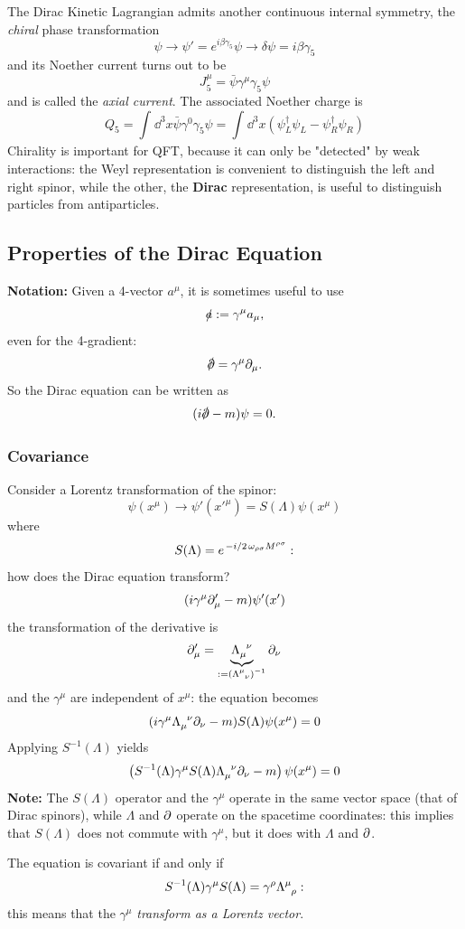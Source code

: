 
The Dirac Kinetic Lagrangian admits another continuous internal symmetry, the
\textit{chiral} phase transformation
$$\psi\rightarrow\psi' = e^{i\beta\gamma_5}\psi\rightarrow
\delta\psi=i\beta\gamma_5$$
and its Noether current turns out to be
$$J^\mu_5 = \bar\psi\gamma^\mu\gamma_5\psi$$
and is called the \textit{axial current}. The associated Noether charge is
$$Q_5 = \int_{}^{}\dd^3x\bar\psi\gamma^0\gamma_5\psi=
\int_{}^{}\dd^3x\left(\psi^\dagger_L\psi_L - \psi^\dagger_R\psi_R\right)$$
Chirality is important for QFT, because it can only be "detected" by weak
interactions: the Weyl representation is convenient to distinguish the left
and right spinor, while the other, the \textbf{Dirac} representation, is useful
to distinguish particles from antiparticles.
\subsection{Properties of the Dirac Equation}
\textbf{Notation:} Given a 4-vector $a^\mu$, it is sometimes useful to use
$$\slashed{a} := \gamma^\mu a_\mu,$$
even for the 4-gradient:
$$\slashed{\pd} = \gamma^\mu\pd_\mu.$$
So the Dirac equation can be written as
$$(i\slashed{\pd}-m)\psi=0.$$
\subsubsection{Covariance}
Consider a Lorentz transformation of the spinor:
$$\psi(x^\mu)\rightarrow\psi'(x'^\mu) = S(\Lambda)\psi(x^\mu)$$
where
$$S(\Lambda) = e^{\flatfrac{-i}{2}\omega_{\rho\sigma}M^{\rho\sigma}}:$$
how does the Dirac equation transform?
$$(i\gamma^\mu\partial_\mu'-m)\psi'(x')$$
the transformation of the derivative is
$$\pd_\mu' = \underbrace{\Lambda\indices{_\mu^\nu}}_{:=\left(
\Lambda\indices{^\mu_\nu}\right)^{-1}}\pd_\nu$$
and the $\gamma^\mu$ are independent of $x^\mu$: the equation becomes
$$(i\gamma^\mu\Lambda\indices{_\mu^\nu}\pd_\nu-m)S(\Lambda)\psi(x^\mu)=0$$
Applying $S^{-1}(\Lambda)$ yields
$$\left(S^{-1}(\Lambda)\gamma^\mu S(\Lambda)\Lambda\indices{_\mu^\nu}\pd_\nu
-m\right)\psi(x^\mu)=0$$
\textbf{Note:} The $S(\Lambda)$ operator and the $\gamma^\mu$ operate in the same
vector space (that of Dirac spinors), while $\Lambda$ and $\partial$ operate on the
spacetime coordinates: this implies that $S(\Lambda)$ does not commute with
$\gamma^\mu$, but it does with $\Lambda$ and $\partial$.

The equation is covariant if and only if
$$S^{-1}(\Lambda)\gamma^\mu S(\Lambda)= \gamma^\rho\Lambda\indices{^\mu_\rho}:$$
this means that the $\gamma^\mu$ \textit{transform as a Lorentz vector}.
